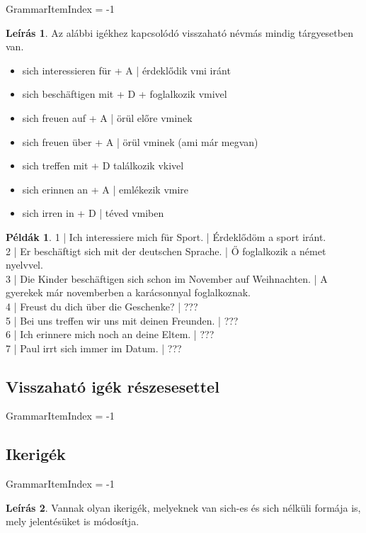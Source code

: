 \documentclass{article}
\theoremstyle{definition}
\newtheorem*{exmp}{Példák}
\newtheorem*{desc}{Leírás}
\begin{document}
GrammarItemIndex = -1

\begin{desc}
Az alábbi igékhez kapcsolódó visszaható névmás mindig tárgyesetben van.

\begin{itemize}
\item sich interessieren für + A | érdeklődik vmi iránt
\item sich beschäftigen mit + D + foglalkozik vmivel
\item sich freuen auf + A | örül előre vminek
\item sich freuen über + A | örül vminek (ami már megvan)
\item sich treffen mit + D  találkozik vkivel
\item sich erinnen an + A | emlékezik vmire
\item sich irren in + D | téved vmiben
\end{itemize}
\end{desc}

\begin{exmp}
1 | Ich interessiere mich für Sport. | Érdeklődöm a sport iránt.\\
2 | Er beschäftigt sich mit der deutschen Sprache. | Ő foglalkozik a német nyelvvel.\\
3 | Die Kinder beschäftigen sich schon im November auf Weihnachten. | A gyerekek már novemberben a karácsonnyal foglalkoznak.\\
4 | Freust du dich über die Geschenke? | ???\\
5 | Bei uns treffen wir uns mit deinen Freunden. | ???\\
6 | Ich erinnere mich noch an deine Eltem. | ???\\
7 | Paul irrt sich immer im Datum. | ???\\
\end{exmp}

\subsection{Visszaható igék részesesettel}

GrammarItemIndex = -1

\subsection{Ikerigék}

GrammarItemIndex = -1

\begin{desc}
Vannak olyan ikerigék, melyeknek van sich-es és sich nélküli
formája is, mely jelentésüket is módosítja.
\end{desc}
\end{document}
